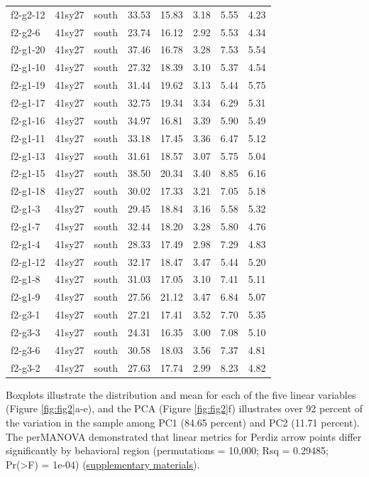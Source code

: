 \documentclass[smallextended]{svjour3}       %
\begin{document}
\begin{longtable}[]{@{}lccccccc@{}}
f2-g2-12 & 41sy27 & south & 33.53 & 15.83 & 3.18 & 5.55 & 4.23 \\
f2-g2-6 & 41sy27 & south & 23.74 & 16.12 & 2.92 & 5.53 & 4.34 \\
f2-g1-20 & 41sy27 & south & 37.46 & 16.78 & 3.28 & 7.53 & 5.54 \\
f2-g1-10 & 41sy27 & south & 27.32 & 18.39 & 3.10 & 5.37 & 4.54 \\
f2-g1-19 & 41sy27 & south & 31.44 & 19.62 & 3.13 & 5.44 & 5.75 \\
f2-g1-17 & 41sy27 & south & 32.75 & 19.34 & 3.34 & 6.29 & 5.31 \\
f2-g1-16 & 41sy27 & south & 34.97 & 16.81 & 3.39 & 5.90 & 5.49 \\
f2-g1-11 & 41sy27 & south & 33.18 & 17.45 & 3.36 & 6.47 & 5.12 \\
f2-g1-13 & 41sy27 & south & 31.61 & 18.57 & 3.07 & 5.75 & 5.04 \\
f2-g1-15 & 41sy27 & south & 38.50 & 20.34 & 3.40 & 8.85 & 6.16 \\
f2-g1-18 & 41sy27 & south & 30.02 & 17.33 & 3.21 & 7.05 & 5.18 \\
f2-g1-3 & 41sy27 & south & 29.45 & 18.84 & 3.16 & 5.58 & 5.32 \\
f2-g1-7 & 41sy27 & south & 32.44 & 18.20 & 3.28 & 5.80 & 4.76 \\
f2-g1-4 & 41sy27 & south & 28.33 & 17.49 & 2.98 & 7.29 & 4.83 \\
f2-g1-12 & 41sy27 & south & 32.17 & 18.47 & 3.47 & 5.44 & 5.20 \\
f2-g1-8 & 41sy27 & south & 31.03 & 17.05 & 3.10 & 7.41 & 5.11 \\
f2-g1-9 & 41sy27 & south & 27.56 & 21.12 & 3.47 & 6.84 & 5.07 \\
f2-g3-1 & 41sy27 & south & 27.21 & 17.41 & 3.52 & 7.70 & 5.35 \\
f2-g3-3 & 41sy27 & south & 24.31 & 16.35 & 3.00 & 7.08 & 5.10 \\
f2-g3-6 & 41sy27 & south & 30.58 & 18.03 & 3.56 & 7.37 & 4.81 \\
f2-g3-2 & 41sy27 & south & 27.63 & 17.74 & 2.99 & 8.23 & 4.82 \\
\bottomrule()
\end{longtable}

Boxplots illustrate the distribution and mean for each of the five
linear variables (Figure \ref{fig:fig2}a-e), and the PCA (Figure
\ref{fig:fig2}f) illustrates over 92 percent of the variation in the
sample among PC1 (84.65 percent) and PC2 (11.71 percent). The perMANOVA
demonstrated that linear metrics for Perdiz arrow points differ
significantly by behavioral region (permutations = 10,000; Rsq =
0.29485; Pr(\textgreater F) = 1e-04)
(\href{https://seldenlab.github.io/perdiz3/}{supplementary materials}).
\end{document}
